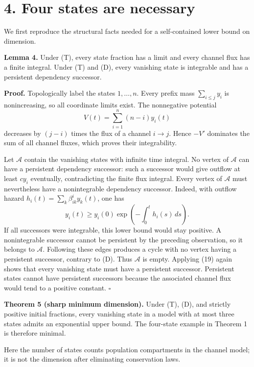 \documentclass[
  11pt,
  a4paper,
]{scrartcl}
\begin{document}
\section{4. Four states are necessary}\label{four-states-are-necessary}

We first reproduce the structural facts needed for a self-contained
lower bound on dimension.

\textbf{Lemma 4.} Under (T), every state fraction has a limit and every
channel flux has a finite integral. Under (T) and (D), every vanishing
state is integrable and has a persistent dependency successor.

\textbf{Proof.} Topologically label the states \(1,\ldots,n\). Every
prefix mass \(\sum_{i\le j}y_i\) is nonincreasing, so all coordinate
limits exist. The nonnegative potential \[
V(t)=\sum_{i=1}^n(n-i)y_i(t)
\] decreases by \((j-i)\) times the flux of a channel \(i\to j\). Hence
\(-V'\) dominates the sum of all channel fluxes, which proves their
integrability.

Let \(\mathcal A\) contain the vanishing states with infinite time
integral. No vertex of \(\mathcal A\) can have a persistent dependency
successor: such a successor would give outflow at least \(c y_i\)
eventually, contradicting the finite flux integral. Every vertex of
\(\mathcal A\) must nevertheless have a nonintegrable dependency
successor. Indeed, with outflow hazard
\(h_i(t)=\sum_k\beta^i_{ik}y_k(t)\), one has \[
y_i(t)\ge y_i(0)\exp\left(-\int_0^t h_i(s)\,ds\right).
\tag{19}
\] If all successors were integrable, this lower bound would stay
positive. A nonintegrable successor cannot be persistent by the
preceding observation, so it belongs to \(\mathcal A\). Following these
edges produces a cycle with no vertex having a persistent successor,
contrary to (D). Thus \(\mathcal A\) is empty. Applying (19) again shows
that every vanishing state must have a persistent successor. Persistent
states cannot have persistent successors because the associated channel
flux would tend to a positive constant. \(\square\)

\textbf{Theorem 5 (sharp minimum dimension).} Under (T), (D), and
strictly positive initial fractions, every vanishing state in a model
with at most three states admits an exponential upper bound. The
four-state example in Theorem 1 is therefore minimal.

Here the number of states counts population compartments in the channel
model; it is not the dimension after eliminating conservation laws.
\end{document}
